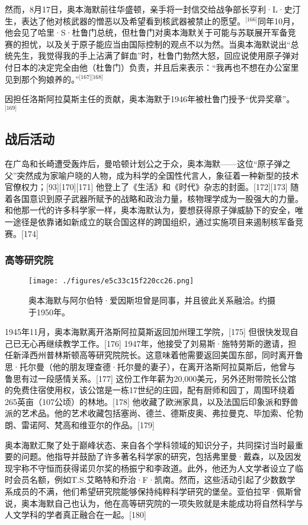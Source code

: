 然而，8月17日，奥本海默前往华盛顿，亲手将一封信交给战争部长亨利·L·史汀生，表达了他对核武器的憎恶以及希望看到核武器被禁止的愿望。\(^\text{[166]}\)同年10月，他会见了哈里·S·杜鲁门总统，但杜鲁门对奥本海默关于可能与苏联展开军备竞赛的担忧，以及关于原子能应当由国际控制的观点不以为然。当奥本海默说出“总统先生，我觉得我的手上沾满了鲜血”时，杜鲁门勃然大怒，回应说使用原子弹对付日本的决定完全由他（杜鲁门）负责，并且后来表示：“我再也不想在办公室里见到那个狗娘养的。”\(^\text{[167][168]}\)

因担任洛斯阿拉莫斯主任的贡献，奥本海默于1946年被杜鲁门授予“优异奖章”。\(^\text{[169]}\)
\subsection{战后活动}
在广岛和长崎遭受轰炸后，曼哈顿计划公之于众，奥本海默——这位“原子弹之父”突然成为家喻户晓的人物，成为科学的全国性代言人，象征着一种新型的技术官僚权力；[93][170][171] 他登上了《生活》和《时代》杂志的封面。[172][173] 随着各国意识到原子武器所赋予的战略和政治力量，核物理学成为一股强大的力量。和他那一代的许多科学家一样，奥本海默认为，要想获得原子弹威胁下的安全，唯一途径是依靠诸如新成立的联合国这样的跨国组织，通过实施项目来遏制核军备竞赛。[174]
\subsubsection{高等研究院}
\begin{figure}[ht]
\centering
\texttt{[image: ./figures/e5c33c15f220cc26.png]}
\caption{奥本海默与阿尔伯特·爱因斯坦曾是同事，并且彼此关系融洽。约摄于1950年。} \label{fig_ABHM_9}
\end{figure}
1945年11月，奥本海默离开洛斯阿拉莫斯返回加州理工学院，[175] 但很快发现自己已无心再继续教学工作。[176] 1947年，他接受了刘易斯·施特劳斯的邀请，担任新泽西州普林斯顿高等研究院院长。这意味着他需要返回美国东部，同时离开鲁思·托尔曼（他的朋友理查德·托尔曼的妻子），在离开洛斯阿拉莫斯后，他曾与鲁思有过一段感情关系。[177] 这份工作年薪为20,000美元，另外还附带院长公馆的免费住宿使用权，该公馆是一栋17世纪的庄园，配有厨师和园丁，周围环绕着265英亩（107公顷）的林地。[178] 他收藏了欧洲家具，以及法国后印象派和野兽派的艺术品。他的艺术收藏包括塞尚、德兰、德斯皮奥、弗拉曼克、毕加索、伦勃朗、雷诺阿、梵高和维亚尔的作品。[179]

奥本海默汇聚了处于巅峰状态、来自各个学科领域的知识分子，共同探讨当时最重要的问题。他指导并鼓励了许多著名科学家的研究，包括弗里曼·戴森，以及因发现宇称不守恒而获得诺贝尔奖的杨振宁和李政道。此外，他还为人文学者设立了临时会员名额，例如T.S.艾略特和乔治·F·凯南。然而，这些活动引起了少数数学系成员的不满，他们希望研究院能够保持纯粹科学研究的堡垒。亚伯拉罕·佩斯曾说，奥本海默自己也认为，他在高等研究院的一项失败就是未能成功将自然科学与人文学科的学者真正融合在一起。[180]

